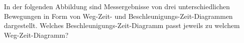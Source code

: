 \begin{ExerciseBlock}
In der folgenden Abbildung sind Messergebnisse von drei unterschiedlichen Bewegungen in Form von Weg-Zeit- und Beschleunigungs-Zeit-Diagrammen dargestellt. Welches Beschleunigungs-Zeit-Diagramm passt jeweils zu welchem Weg-Zeit-Diagramm?

\begin{center}
\end{center}
\end{ExerciseBlock}
